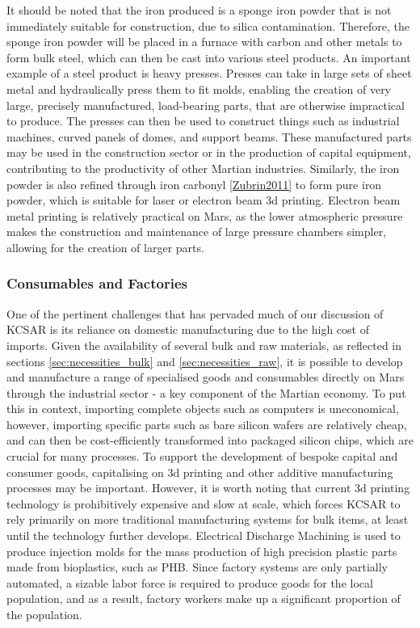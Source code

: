 \documentclass[fleqn,10pt]{Stylesheet} %
\begin{document}
It should be noted that the iron produced is a sponge iron powder that is not immediately suitable for construction, due to silica contamination. Therefore, the sponge iron powder will be placed in a furnace with carbon and other metals to form bulk steel, which can then be cast into various steel products. An important example of a steel product is heavy presses. Presses can take in large sets of sheet metal and hydraulically press them to fit molds, enabling the creation of very large, precisely manufactured, load-bearing parts, that are otherwise impractical to produce. The presses can then be used to construct things such as industrial machines, curved panels of domes, and support beams. These manufactured parts may be used in the construction sector or in the production of capital equipment, contributing to the productivity of other Martian industries. Similarly, the iron powder is also refined through iron carbonyl \ref{Zubrin2011} to form pure iron powder, which is suitable for laser or electron beam 3d printing. Electron beam metal printing is relatively practical on Mars, as the lower atmospheric pressure makes the construction and maintenance of large pressure chambers simpler, allowing for the creation of larger parts.

\subsubsection{Consumables and Factories}
\label{sec:necessities_consumable}

One of the pertinent challenges that has pervaded much of our discussion of KCSAR is its reliance on domestic manufacturing due to the high cost of imports. Given the availability of several bulk and raw materials, as reflected in sections \ref{sec:necessities_bulk} and \ref{sec:necessities_raw}, it is possible to develop and manufacture a range of specialised goods and consumables directly on Mars through the industrial sector - a key component of the Martian economy. To put this in context, importing complete objects such as computers is uneconomical, however, importing specific parts such as bare silicon wafers are relatively cheap, and can then be cost-efficiently transformed into packaged silicon chips, which are crucial for many processes. To support the development of bespoke capital and consumer goods, capitalising on 3d printing and other additive manufacturing processes may be important. However, it is worth noting that current 3d printing technology is prohibitively expensive and slow at scale, which forces KCSAR to rely primarily on more traditional manufacturing systems for bulk items, at least until the technology further develops. Electrical Discharge Machining is used to produce injection molds for the mass production of high precision plastic parts made from bioplastics, such as PHB. Since factory systems are only partially automated\cite{Huang2017}, a sizable labor force is required to produce goods for the local population, and as a result, factory workers make up a significant proportion of the population.
\end{document}
